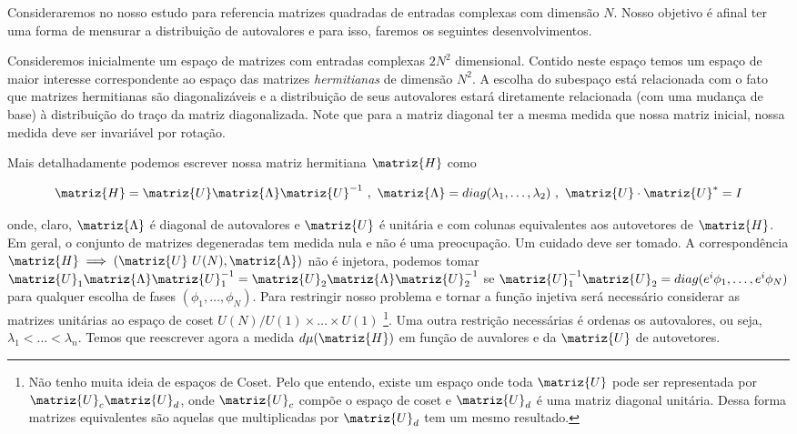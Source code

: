 Consideraremos no nosso estudo para referencia matrizes quadradas de entradas complexas com dimensão $N$. Nosso objetivo é afinal ter uma forma de mensurar a distribuição de autovalores e para isso, faremos os seguintes desenvolvimentos.

Consideremos inicialmente um espaço de matrizes com entradas complexas $2N^2$ dimensional. Contido neste espaço temos um espaço de maior interesse correspondente ao espaço das matrizes \textit{hermitianas} de dimensão $N^2$. A escolha do subespaço está relacionada com o fato que matrizes hermitianas são diagonalizáveis e a distribuição de seus autovalores estará diretamente relacionada (com uma mudança de base) à distribuição do traço da matriz diagonalizada. Note que para a matriz diagonal ter a mesma medida que nossa matriz inicial, nossa medida deve ser invariável por rotação.

Mais detalhadamente podemos escrever nossa matriz hermitiana $\matriz{H}$ como 

\[
\matriz{H} = \matriz{U} \matriz{\Lambda} \matriz{U}^{-1} \ , \ \matriz{\Lambda} = diag(\lambda_1, \dots, \lambda_2) \ , \ \matriz{U}\cdot\matriz{U}^* = I
\]

onde, claro, $\matriz{\Lambda}$ é diagonal de autovalores e $\matriz{U}$ é unitária e com colunas equivalentes aos autovetores de $\matriz{H}$. Em geral, o conjunto de matrizes degeneradas tem medida nula e não é uma preocupação. Um cuidado deve ser tomado. A correspondência $\matriz{H} \implies (\matriz{U} \ U(N), \matriz{\Lambda})$ não é injetora, podemos tomar $\matriz{U}_1 \matriz{\Lambda} \matriz{U}_1^{-1} = \matriz{U}_2 \matriz{\Lambda} \matriz{U}_2^{-1}$ se $\matriz{U}_1^{-1} \matriz{U}_2 = diag(e^i\phi_1, \dots, e^i\phi_N)$ para qualquer escolha de fases $(\phi_1, \dots, \phi_N)$. Para restringir nosso problema e tornar a função injetiva será necessário considerar as matrizes unitárias ao espaço de coset $U(N) / U(1) \times \dots \times U(1)$ \footnote{Não tenho muita ideia de espaços de Coset. Pelo que entendo, existe um espaço onde toda $\matriz{U}$ pode ser representada por $\matriz{U}_c \matriz{U}_d$, onde $\matriz{U}_c$ compõe o espaço de coset e $\matriz{U}_d$ é uma matriz diagonal unitária. Dessa forma matrizes equivalentes são aquelas que multiplicadas por $\matriz{U}_d$ tem um mesmo resultado.}. Uma outra restrição necessárias é ordenas os autovalores, ou seja, $\lambda_1 < \dots < \lambda_n$. Temos que reescrever agora a medida $d\mu(\matriz{H})$ em função de auvalores e da $\matriz{U}$ de autovetores.

